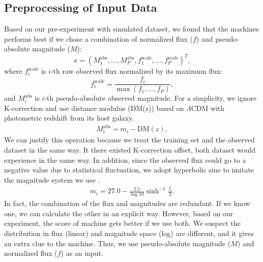 \documentclass[useamsfonts]{pasj01}
\begin{document}
\subsection{Preprocessing of Input Data}
\label{sec:preproc}
Based on our pre-experiment with simulated dataset, we found that the machines performs best if we 
chose a combination of normalized flux ($f$) and pseudo-absolute magnitude ($M$):
\begin{equation}
    x = \left( M_1^\mathrm{abs}, \ldots, M_P^\mathrm{abs}, f_{1}^{\mathrm{scale}}, \ldots, f_{P}^{\mathrm{scale}} \right)^T,
\end{equation}
where $f_{i}^{\mathrm{scale}}$ is $i$-th raw observed flux normalized by its maximum flux:
\begin{equation}
    f_{i}^{\mathrm{scale}} = \frac{f_i}{\max \left(f_1, \ldots, f_P \right)},    \label{eq:scaled_flux}
\end{equation}
and $M_i^\mathrm{abs}$ is $i$-th pseudo-absolute observed magnitude.
For a simplicity, we ignore K-correction and use distance modulus (DM(z)) based on $\Lambda$CDM with photometric redshift
from its host galaxy.
\begin{eqnarray}
    M_i^\mathrm{abs} = m_i - \mathrm{DM}\left(z\right),
\end{eqnarray}
We can justify this operation because we treat the training set and the observed dataset in the same way.
It there existed K-correction offset, both dataset would experience in the same way.
In addition, since the observed flux could go to a negative value due to statistical fluctuation, 
we adopt hyperbolic sine to imitate the magnitude system we use \citep{lupton99a}.  
\begin{eqnarray}
    m_i = 27.0 - \frac{2.5}{\log 10} \sinh^{-1} \frac{f_i}{2}. \label{eq:mag} 
\end{eqnarray}
In fact, the combination of the flux and magnitudes are redundant.   If we know one, we can calculate the other
in an explicit way.   
However, based on our experiment, the score of machine gets better if we use both.  
We suspect the distribution in flux (linear) and magnitude space (log) are different, 
and it gives an extra clue to the machine.
Thus, we use pseudo-absolute magnitude ($M$) and normalized flux ($f$) as an input.
\end{document}
